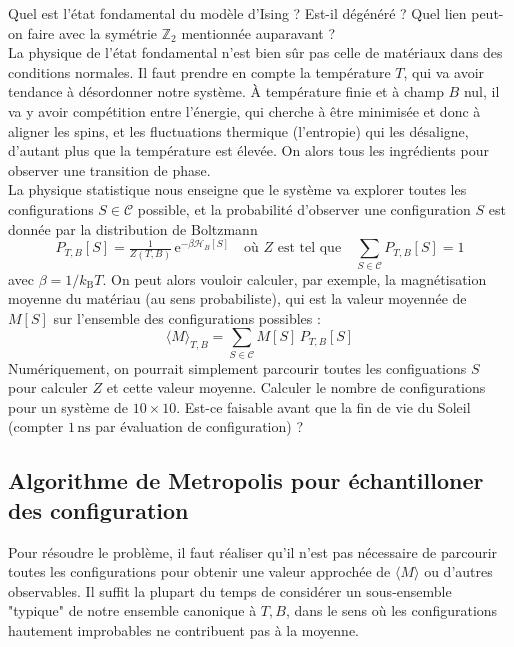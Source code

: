 \documentclass{book}
\begin{document}
Quel est l'état fondamental du modèle d'Ising ? Est-il dégénéré ? Quel lien peut-on faire avec la symétrie $\mathbb{Z}_2$ mentionnée auparavant ?\\

La physique de l'état fondamental n'est bien sûr pas celle de matériaux dans des conditions normales. Il faut prendre en compte la température $T$, qui va avoir tendance à désordonner notre système. À température finie et à champ $B$ nul, il va y avoir compétition entre l'énergie, qui cherche à être minimisée et donc à aligner les spins, et les fluctuations thermique (l'entropie) qui les désaligne, d'autant plus que la température est élevée. On alors tous les ingrédients pour observer une transition de phase.\\

La physique statistique nous enseigne que le système va explorer toutes les configurations $S\in\mathcal{C}$ possible, et la probabilité d'observer une configuration $S$ est donnée par la distribution de Boltzmann
\begin{equation}
P_{T,B}[S]=\tfrac{1}{Z({T,B})}\,\mathrm{e}^{-\beta \mathcal{H}_B[S]} \quad \text{où $Z$ est tel que} \quad \sum_{S\in\mathcal{C}}P_{T,B}[S] = 1
\end{equation}
avec $\beta=1/k_\mathrm{B}T$. On peut alors vouloir calculer, par exemple, la magnétisation moyenne du matériau (au sens probabiliste), qui est la valeur moyennée de $M[S]$ sur l’ensemble des configurations possibles :
\begin{equation}
\langle M\rangle_{T,B} = \sum_{S\in\mathcal{C}} M[S]\,P_{T,B}[S]
\end{equation}
Numériquement, on pourrait simplement parcourir toutes les configuations $S$ pour calculer $Z$ et cette valeur moyenne. Calculer le nombre de configurations pour un système de $10\times 10$. Est-ce faisable avant que la fin de vie du Soleil (compter $1\,\mathrm{ns}$ par évaluation de configuration) ?

\subsection{Algorithme de Metropolis pour échantilloner des configuration}

Pour résoudre le problème, il faut réaliser qu'il n'est pas nécessaire de parcourir toutes les configurations pour obtenir une valeur approchée de $\langle M\rangle$ ou d'autres observables. Il suffit la plupart du temps de considérer un sous-ensemble "typique" de notre ensemble canonique à $T,B$, dans le sens où les configurations hautement improbables ne contribuent pas à la moyenne.\\
\end{document}
